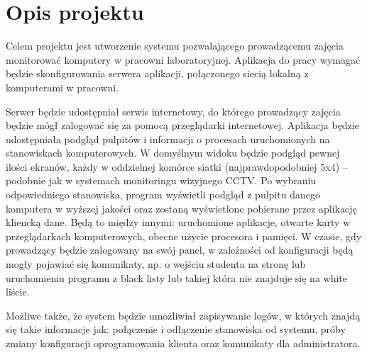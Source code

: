 \section {Opis projektu}
Celem projektu jest utworzenie systemu pozwalającego prowadzącemu zajęcia monitorować komputery w pracowni laboratoryjnej. Aplikacja do pracy wymagać będzie skonfigurowania serwera aplikacji, połączonego siecią lokalną z komputerami w pracowni. 

Serwer będzie udostępniał serwis internetowy, do którego prowadzący zajęcia będzie mógł zalogować się za pomocą przeglądarki internetowej. Aplikacja będzie udostępniała podgląd pulpitów i informacji o procesach uruchomionych na stanowiskach komputerowych. W domyślnym widoku będzie podgląd pewnej ilości ekranów, każdy w oddzielnej komórce siatki (najprawdopodobniej 5x4) -- podobnie jak w systemach monitoringu wizyjnego CCTV. Po wybraniu odpowiedniego stanowiska, program wyświetli podgląd z pulpitu danego komputera w wyższej jakości oraz zostaną wyświetlone pobierane przez aplikację kliencką dane. Będą to między innymi: uruchomione aplikacje, otwarte karty w przeglądarkach komputerowych, obecne użycie procesora i pamięci. W czasie, gdy prowadzący będzie zalogowany na swój panel, w zależności od konfiguracji będą mogły pojawiać się komunikaty, np. o wejściu studenta na stronę lub uruchomieniu programu z black listy lub takiej która nie znajduje się na white liście. 

Możliwe także, że system będzie umożliwiał zapisywanie logów, w których znajdą się takie informacje jak: połączenie i odłączenie stanowiska od systemu, próby zmiany konfiguracji oprogramowania klienta oraz komunikaty dla administratora.



